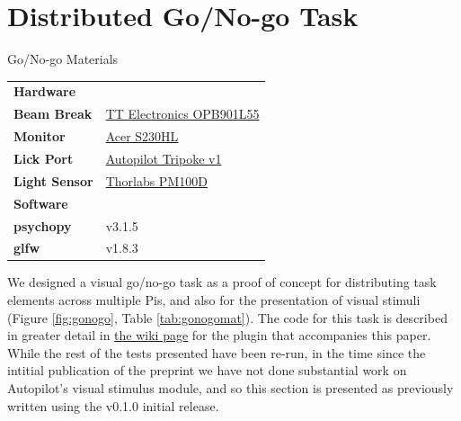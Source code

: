 \section{Distributed Go/No-go Task}
\label{sec:gonogo}

\begin{margintable}[-1.5cm]
\caption{Go/No-go Materials}
\label{tab:gonogomat}
\noindent\begin{tabularx}{\linewidth}{lX}%
\toprule
\textbf{Hardware} & \\
\textbf{Beam Break} & \href{https://wiki.auto-pi-lot.com/index.php/TT_Electronics_OPB901L55}{TT Electronics OPB901L55} \\
\textbf{Monitor} & \href{https://www.productchart.com/monitors/16901}{Acer S230HL} \\
\textbf{Lick Port} & \href{https://wiki.auto-pi-lot.com/index.php/Autopilot_Tripoke}{Autopilot Tripoke v1} \\
\textbf{Light Sensor} & \href{https://www.thorlabs.com/newgrouppage9.cfm?objectgroup_id=3341}{Thorlabs PM100D} \\
\midrule
\textbf{Software} & \\
\textbf{psychopy} & v3.1.5 \\
\textbf{glfw} & v1.8.3 \\
\bottomrule
\end{tabularx}
\end{margintable}{}

We designed a visual go/no-go task as a proof of concept for distributing task elements across multiple Pis, and also for the presentation of visual stimuli (Figure \ref{fig:gonogo}, Table \ref{tab:gonogomat}). The code for this task is described in greater detail in \href{https://wiki.auto-pi-lot.com/index.php/Plugin:Autopilot_Paper}{the wiki page} for the plugin that accompanies this paper. While the rest of the tests presented have been re-run, in the time since the intitial publication of the preprint we have not done substantial work on Autopilot's visual stimulus module, and so this section is presented as previously written using the v0.1.0 initial release.

